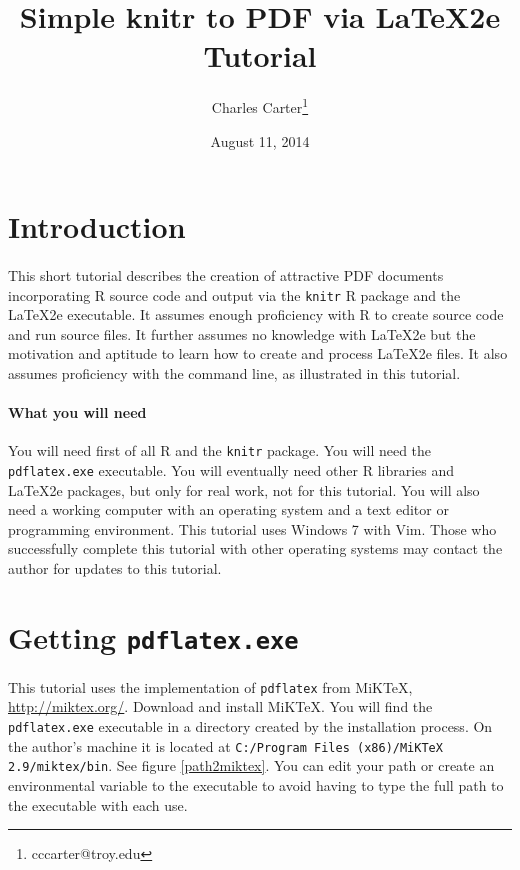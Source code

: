\documentclass{article}
\title{Simple knitr to PDF via \LaTeX2e{} Tutorial}
\author{Charles Carter\thanks{cccarter@troy.edu}}
\date{August 11, 2014}
\begin{document}
\maketitle{}

\section{Introduction}

\paragraph{}This short tutorial describes the creation of attractive PDF documents incorporating \textsf{R} source code and output via the \texttt{knitr} \textsf{R} package and the \LaTeX2e{} executable. It assumes enough proficiency with \textsf{R} to create source code and run source files. It further assumes no knowledge with \LaTeX2e{} but the motivation and aptitude to learn how to create and process \LaTeX2e{} files. It also assumes proficiency with the command line, as illustrated in this tutorial.

\paragraph{What you will need}You will need first of all \textsf{R} and the \texttt{knitr} package. You will need the \texttt{pdflatex.exe} executable. You will eventually need other \textsf{R} libraries and \LaTeX2e{} packages, but only for real work, not for this tutorial. You will also need a working computer with an operating system and a text editor or programming environment. This tutorial uses Windows 7 with Vim. Those who successfully complete this tutorial with other operating systems may contact the author for updates to this tutorial.

\section{Getting \texttt{pdflatex.exe}}

\paragraph{}This tutorial uses the implementation of \texttt{pdflatex} from MiKTeX, \url{http://miktex.org/}. Download and install MiKTeX. You will find the \texttt{pdflatex.exe} executable in a directory created by the installation process. On the author's machine it is located at \texttt{C:/Program Files (x86)/MiKTeX 2.9/miktex/bin}. See figure \ref{path2miktex}. You can edit your path or create an environmental variable to the executable to avoid having to type the full path to the executable with each use.
\end{document}

